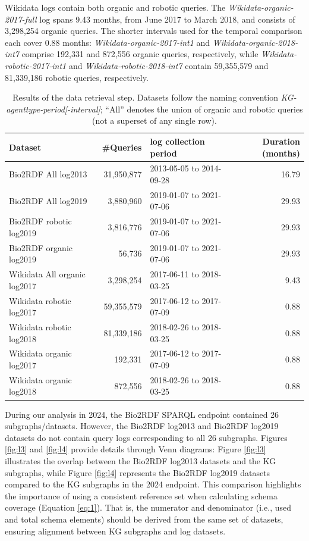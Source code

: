 \documentclass[sw]{iosart2x}
\begin{document}
Wikidata logs contain both organic and robotic queries. The \emph{Wikidata-organic-2017-full} log spans 9.43 months, from June 2017 to March 2018, and consists of 3,298,254 organic queries. The shorter intervals used for the temporal comparison each cover 0.88 months: \emph{Wikidata-organic-2017-int1} and \emph{Wikidata-organic-2018-int7} comprise 192,331 and 872,556 organic queries, respectively, while \emph{Wikidata-robotic-2017-int1} and \emph{Wikidata-robotic-2018-int7} contain 59,355,579 and 81,339,186 robotic queries, respectively.

\begin{table}[h!]
\centering
\caption{Results of the data retrieval step. Datasets follow the naming convention \emph{KG-agenttype-period[-interval]}; ``All'' denotes the union of organic and robotic queries (not a superset of any single row).}
\label{tab:1}
\begin{tabular}{l|r|l|r} 
\hline
\textbf{Dataset} & \#\textbf{Queries} & \textbf{log collection period} & \textbf{Duration (months)} \\ \hline
Bio2RDF All log2013 & 31,950,877 & 2013-05-05 to 2014-09-28 & 16.79 \\ 
Bio2RDF All log2019 & 3,880,960  & 2019-01-07 to 2021-07-06 & 29.93 \\ 
Bio2RDF robotic log2019 & 3,816,776  & 2019-01-07 to 2021-07-06 & 29.93 \\ 
Bio2RDF organic log2019 & 56,736 & 2019-01-07 to 2021-07-06 & 29.93 \\ 
Wikidata All organic log2017 & 3,298,254 & 2017-06-11 to 2018-03-25 & 9.43 \\ 
Wikidata robotic log2017 & 59,355,579 & 2017-06-12 to 2017-07-09 & 0.88 \\ 
Wikidata robotic log2018 & 81,339,186 & 2018-02-26 to 2018-03-25 & 0.88 \\ 
 Wikidata organic log2017&
192,331&
2017-06-12 to 2017-07-09&
0.88\\
Wikidata organic log2018&
872,556&
 2018-02-26 to 2018-03-25&
0.88\\
\hline
\end{tabular}
\end{table}

During our analysis in 2024, the Bio2RDF SPARQL endpoint contained 26 subgraphs/datasets. However, the Bio2RDF log2013 and Bio2RDF log2019 datasets do not contain query logs corresponding to all 26 subgraphs. Figures \ref{fig:l3} and \ref{fig:l4} provide details through Venn diagrams: Figure \ref{fig:l3} illustrates the overlap between the Bio2RDF log2013 datasets and the KG subgraphs, while Figure \ref{fig:l4} represents the Bio2RDF log2019 datasets compared to the KG subgraphs in the 2024 endpoint. This comparison highlights the importance of using a consistent reference set when calculating schema coverage (Equation \ref{eq:1}). That is, the numerator and denominator (i.e., used and total schema elements) should be derived from the same set of datasets, ensuring alignment between KG subgraphs and log datasets.
\end{document}
